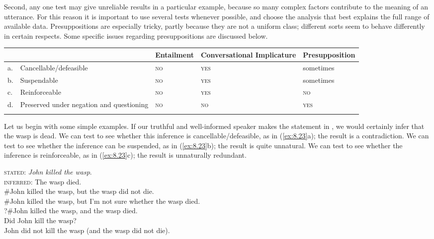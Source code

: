 Second, any one test may give unreliable results in a particular example, because so many complex factors contribute to the meaning of an utterance. For this reason it is important to use several tests whenever possible, and choose the analysis that best explains the full range of available data. Presuppositions are especially tricky, partly because they are not a uniform class; different sorts seem to behave differently in certain respects. Some specific issues regarding presuppositions are discussed below.


\ea\label{ex:8.22}
\begin{tabularx}{\textwidth}{lXXXX}
\lsptoprule
&  & Entailment & Conversational Implicature & Presupposition\\\midrule
a. & Cancellable\slash defeasible & \scshape no & \scshape yes & sometimes\footnotemark{}\\
b. & Suspendable & \scshape no & \scshape yes & sometimes\\
c. & Reinforceable & \scshape no & \scshape yes & \scshape no\\
d. & Preserved under negation and questioning & \scshape no & \scshape no & \scshape yes\\
\lspbottomrule
\end{tabularx}
\z
{}

Let us begin with some simple examples. If our truthful and well-informed speaker makes the statement in , we would certainly infer that the wasp is dead. We can test to see whether this inference is cancellable/defeasible, as in (\ref{ex:8.23}a); the result is a contradiction. We can test to see whether the inference can be suspended, as in (\ref{ex:8.23}b); the result is quite unnatural. We can test to see whether the inference is reinforceable, as in (\ref{ex:8.23}c); the result is unnaturally redundant.


\begin{stylepoints} \label{ex:8.23}
\textsc{stated}: \textit{John killed the wasp}.\\
\textsc{inferred}: The wasp died.\\
\ea \#John killed the wasp, but the wasp did not die.\\
\ex \#John killed the wasp, but I’m not sure whether the wasp died.\\
\ex ?\#John killed the wasp, and the wasp died.\\
\ex Did John kill the wasp?\\
\ex John did not kill the wasp (and the wasp did not die).
                       \z
\end{stylepoints}


